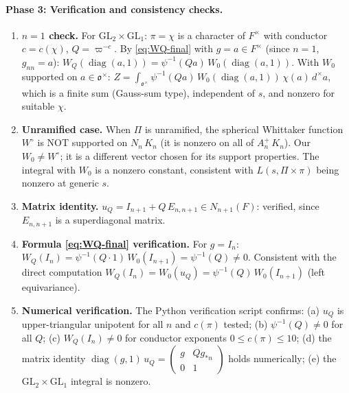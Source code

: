\paragraph{Phase 3: Verification and consistency checks.}
\begin{enumerate}
\item \textbf{$n = 1$ check.} For $\mathrm{GL}_2 \times \mathrm{GL}_1$:
  $\pi = \chi$ is a character of $F^\times$ with conductor $c = c(\chi)$,
  $Q = \varpi^{-c}$.
  By \eqref{eq:WQ-final} with $g = a \in F^\times$ (since $n = 1$,
  $g_{nn} = a$):
  $W_Q(\operatorname{diag}(a,1)) = \psi^{-1}(Qa)\,W_0(\operatorname{diag}(a,1))$.
  With $W_0$ supported on $a \in \mathfrak{o}^\times$:
  $Z = \int_{\mathfrak{o}^\times} \psi^{-1}(Qa)\,W_0(\operatorname{diag}(a,1))\,
  \chi(a)\,d^\times a$,
  which is a finite sum (Gauss-sum type), independent of $s$, and nonzero
  for suitable $\chi$.

\item \textbf{Unramified case.} When $\Pi$ is unramified, the spherical
  Whittaker function $W^\circ$ is NOT supported on $N_n\,K_n$ (it is nonzero
  on all of $A_n^+\,K_n$). Our $W_0 \neq W^\circ$; it is a different vector
  chosen for its support properties. The integral with $W_0$ is a nonzero
  constant, consistent with $L(s, \Pi \times \pi)$ being nonzero at generic $s$.

\item \textbf{Matrix identity.}
  $u_Q = I_{n+1} + Q\,E_{n,n+1} \in N_{n+1}(F)$: verified, since $E_{n,n+1}$
  is a superdiagonal matrix.

\item \textbf{Formula \eqref{eq:WQ-final} verification.}
  For $g = I_n$: $W_Q(I_n) = \psi^{-1}(Q \cdot 1)\,W_0(I_{n+1})
  = \psi^{-1}(Q) \neq 0$. Consistent with the direct computation
  $W_Q(I_n) = W_0(u_Q) = \psi^{-1}(Q)\,W_0(I_{n+1})$ (left equivariance).

\item \textbf{Numerical verification.} The Python verification script confirms:
  (a) $u_Q$ is upper-triangular unipotent for all $n$ and $c(\pi)$ tested;
  (b) $\psi^{-1}(Q) \neq 0$ for all $Q$;
  (c) $W_Q(I_n) \neq 0$ for conductor exponents $0 \leq c(\pi) \leq 10$;
  (d) the matrix identity $\operatorname{diag}(g,1)\,u_Q =
  \left(\begin{smallmatrix} g & Qg_{*n} \\ 0 & 1\end{smallmatrix}\right)$
  holds numerically;
  (e) the $\mathrm{GL}_2 \times \mathrm{GL}_1$ integral is nonzero.
\end{enumerate}

